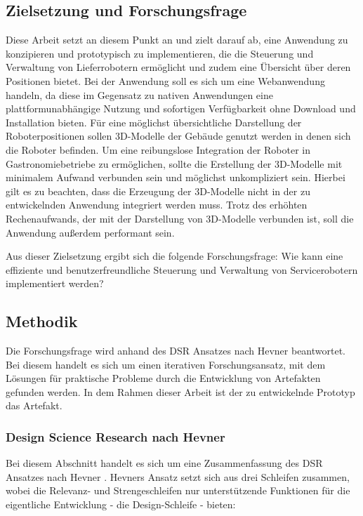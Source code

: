 \subsection{Zielsetzung und Forschungsfrage}\label{sec:ResearchQuestion}
Diese Arbeit setzt an diesem Punkt an und zielt darauf ab, eine Anwendung zu konzipieren und prototypisch zu implementieren, die die Steuerung und Verwaltung von Lieferrobotern ermöglicht und zudem eine Übersicht über deren Positionen bietet. Bei der Anwendung soll es sich um eine Webanwendung handeln, da diese im Gegensatz zu nativen Anwendungen eine plattformunabhängige Nutzung und sofortigen Verfügbarkeit ohne Download und Installation bieten. Für eine möglichst übersichtliche Darstellung der Roboterpositionen sollen 3D-Modelle der Gebäude genutzt werden in denen sich die Roboter befinden. Um eine reibungslose Integration der Roboter in Gastronomiebetriebe zu ermöglichen, sollte die Erstellung der 3D-Modelle mit minimalem Aufwand verbunden sein und möglichst unkompliziert sein. Hierbei gilt es zu beachten, dass die Erzeugung der 3D-Modelle nicht in der zu entwickelnden Anwendung integriert werden muss. Trotz des erhöhten Rechenaufwands, der mit der Darstellung von 3D-Modelle verbunden ist, soll die Anwendung außerdem performant sein.

Aus dieser Zielsetzung ergibt sich die folgende Forschungsfrage: Wie kann eine effiziente und benutzerfreundliche Steuerung und Verwaltung von Servicerobotern implementiert werden?

\subsection{Methodik}
Die Forschungsfrage wird anhand des \ac{DSR} Ansatzes nach Hevner \cite{Hevner2004} beantwortet. Bei diesem handelt es sich um einen iterativen Forschungsansatz, mit dem Lösungen für praktische Probleme durch die Entwicklung von Artefakten gefunden werden. In dem Rahmen dieser Arbeit ist der zu entwickelnde Prototyp das Artefakt.

\subsubsection{Design Science Research nach Hevner}
Bei diesem Abschnitt handelt es sich um eine Zusammenfassung des \ac{DSR} Ansatzes nach Hevner \cite[S.~79-81]{Hevner2004}. Hevners Ansatz setzt sich aus drei Schleifen zusammen, wobei die Relevanz- und Strengeschleifen nur unterstützende Funktionen für die eigentliche Entwicklung - die Design-Schleife - bieten:

